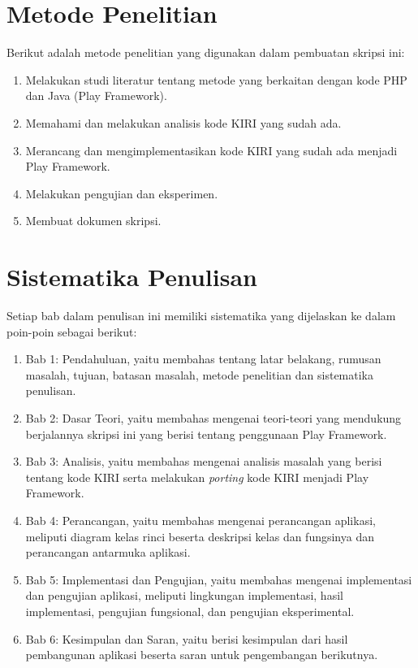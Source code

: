 \section{Metode Penelitian}
\label{sec:metodePenelitian}
Berikut adalah metode penelitian yang digunakan dalam pembuatan skripsi ini:
	\begin{enumerate}
		\item Melakukan studi literatur tentang metode yang berkaitan dengan kode PHP dan Java (Play Framework).
		\item Memahami dan melakukan analisis kode KIRI yang sudah ada.
		\item Merancang dan mengimplementasikan kode KIRI yang sudah ada menjadi Play Framework.
		\item Melakukan pengujian dan eksperimen.
		\item Membuat dokumen skripsi.
	\end{enumerate}
	
\section{Sistematika Penulisan}
\label{sec:sistematikaPenulisan}
Setiap bab dalam penulisan ini memiliki sistematika yang dijelaskan ke dalam poin-poin sebagai berikut:
	\begin{enumerate}
		\item Bab 1: Pendahuluan, yaitu membahas tentang latar belakang, rumusan masalah, tujuan, batasan masalah, metode penelitian dan sistematika penulisan.
		\item Bab 2: Dasar Teori, yaitu membahas mengenai teori-teori yang mendukung berjalannya skripsi ini yang berisi tentang penggunaan Play Framework.
		\item Bab 3: Analisis, yaitu membahas mengenai analisis masalah yang berisi tentang kode KIRI serta melakukan \textit{porting} kode KIRI menjadi Play Framework.
	\item Bab 4: Perancangan, yaitu membahas mengenai perancangan aplikasi, meliputi diagram kelas rinci beserta deskripsi kelas dan fungsinya dan perancangan antarmuka aplikasi.
	\item Bab 5: Implementasi dan Pengujian, yaitu membahas mengenai implementasi dan pengujian aplikasi, meliputi lingkungan implementasi, hasil implementasi, pengujian fungsional, dan pengujian eksperimental.
	\item Bab 6: Kesimpulan dan Saran, yaitu berisi kesimpulan dari hasil pembangunan aplikasi beserta saran untuk pengembangan berikutnya.
	\end{enumerate}
		